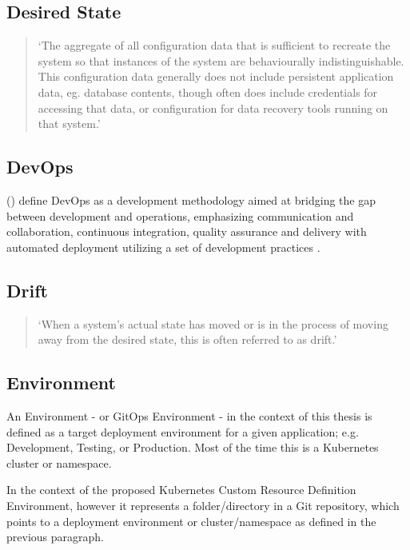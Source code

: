 \subsection*{Desired State}
\begin{quotation}
\noindent
\enquote*{The aggregate of all configuration data that is sufficient to recreate the system so that instances of the system are behaviourally indistinguishable. This configuration data generally does not include persistent application data, eg. database contents, though often does include credentials for accessing that data, or configuration for data recovery tools running on that system.}
\autocite{gitopsGlossary}
\end{quotation}

\subsection*{DevOps}

\citeauthor{devopsDefinition2016} (\citeyear{devopsDefinition2016})
define DevOps as
a development methodology aimed at bridging the gap between
development and operations, emphasizing communication and collaboration,
continuous integration, quality assurance and delivery with automated deployment
utilizing a set of development practices
\autocite{devopsDefinition2016}.

\subsection*{Drift}
\begin{quotation}
\noindent
\enquote*{When a system's actual state has moved or is in the process of moving away from the desired state, this is often referred to as drift.}
\autocite{gitopsGlossary}
\end{quotation}

\subsection*{Environment}

An Environment
- or GitOps Environment -
in the context of this thesis
is defined as a target deployment environment for a given application;
e.g. Development, Testing, or Production.
Most of the time this is a Kubernetes cluster or namespace.

In the context of the proposed Kubernetes Custom Resource Definition
Environment, however it represents a folder/directory in a Git repository,
which points to a deployment environment or cluster/namespace as defined
in the previous paragraph.

